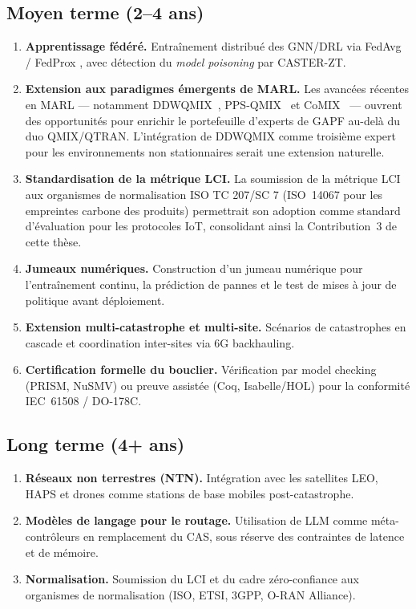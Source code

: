 \subsection{Moyen terme (2--4 ans)}

\begin{enumerate}[resume]
    \item \textbf{Apprentissage fédéré.} Entraînement distribué des GNN/DRL via FedAvg \cite{McMahan2017FedAvg} / FedProx \cite{Li2020FedProx}, avec détection du \emph{model poisoning} par CASTER-ZT.
    \item \textbf{Extension aux paradigmes émergents de MARL.} Les avancées récentes en MARL --- notamment DDWQMIX~\cite{ddwqmix_cac2024}, PPS-QMIX~\cite{pps_qmix_arxiv2024} et CoMIX~\cite{comix_arxiv2024} --- ouvrent des opportunités pour enrichir le portefeuille d'experts de GAPF au-delà du duo QMIX/QTRAN. L'intégration de DDWQMIX comme troisième expert pour les environnements non stationnaires serait une extension naturelle.
    \item \textbf{Standardisation de la métrique LCI.} La soumission de la métrique LCI aux organismes de normalisation ISO TC 207/SC 7 (ISO~14067 pour les empreintes carbone des produits) permettrait son adoption comme standard d'évaluation pour les protocoles IoT, consolidant ainsi la Contribution~3 de cette thèse.
    \item \textbf{Jumeaux numériques.} Construction d'un jumeau numérique \cite{Nguyen2024DTORAN} pour l'entraînement continu, la prédiction de pannes et le test de mises à jour de politique avant déploiement.
    \item \textbf{Extension multi-catastrophe et multi-site.} Scénarios de catastrophes en cascade et coordination inter-sites via 6G backhauling.
    \item \textbf{Certification formelle du bouclier.} Vérification par model checking (PRISM, NuSMV) ou preuve assistée (Coq, Isabelle/HOL) pour la conformité IEC~61508 / DO-178C.
\end{enumerate}

\subsection{Long terme (4+ ans)}

\begin{enumerate}[resume]
    \item \textbf{Réseaux non terrestres (NTN).} Intégration avec les satellites LEO, HAPS et drones comme stations de base mobiles post-catastrophe.
    \item \textbf{Modèles de langage pour le routage.} Utilisation de LLM comme méta-contrôleurs en remplacement du CAS, sous réserve des contraintes de latence et de mémoire.
    \item \textbf{Normalisation.} Soumission du LCI et du cadre zéro-confiance aux organismes de normalisation (ISO, ETSI, 3GPP, O-RAN Alliance).
\end{enumerate}


